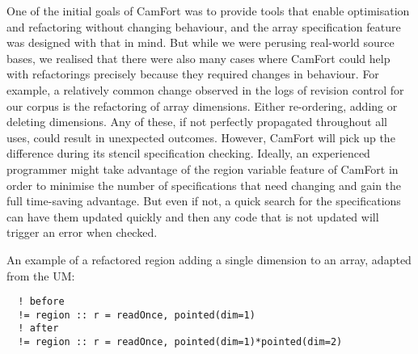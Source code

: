 One of the initial goals of CamFort was to provide tools that enable
optimisation and refactoring without changing behaviour, and the
array specification feature was designed with that in mind. But
while we were perusing real-world source bases, we realised that there
were also many cases where CamFort could help with refactorings
precisely because they required changes in behaviour. For example, a
relatively common change observed in the logs of revision control for
our corpus is the refactoring of array dimensions. Either
re-ordering, adding or deleting dimensions. Any of these, if not
perfectly propagated throughout all uses, could result in unexpected
outcomes. However, CamFort will pick up the difference during its
stencil specification checking. Ideally, an experienced programmer might
take advantage of the region variable feature of CamFort in order to
minimise the number of specifications that need changing and gain the
full time-saving advantage. But even if not, a quick search for the
specifications can have them updated quickly and then any code that is
not updated will trigger an error when checked.

An example of a refactored region adding a single dimension to an array, adapted from the UM:
\begin{verbatim}
  ! before
  != region :: r = readOnce, pointed(dim=1)
  ! after
  != region :: r = readOnce, pointed(dim=1)*pointed(dim=2)
\end{verbatim}


